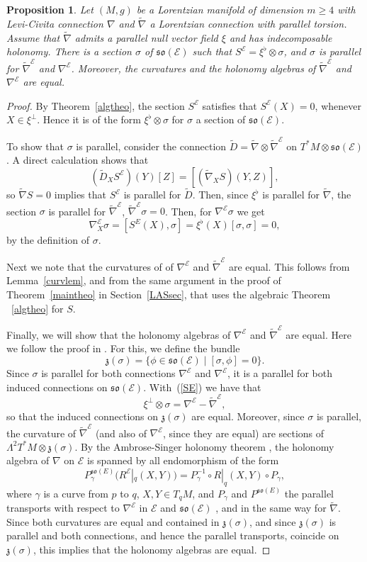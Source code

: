 \documentclass[11pt,a4paper]{amsart}
\def\blu{\color[rgb]{0,0,1}}
\newcommand{\tnab}{\widetilde{\nabla}}
\newcommand{\z}{\mathfrak{z}}
\newcommand{\+}{\oplus}
\newcommand{\so}{\mathfrak{so}}
\newcommand{\1}{\mathbf{1}}
\newcommand{\Tcom}[1]{\marginpar{\scriptsize \blu\tt #1}}
\newcommand{\E}{\mathcal{E}}
\newcommand{\tnabE}{\tnab^{\mathcal{E}}}
\newcommand{\nabE}{\nabla^{\mathcal{E}}}
\newcommand{\<}{\langle}
\renewcommand{\>}{\rangle}
\theoremstyle{definition}
\theoremstyle{plain}
\newtheorem{proposition}[definition]{Proposition}
\numberwithin{equation}{section}
\begin{document}
\begin{proposition}\label{screenprop}Let $(M,g)$ be a Lorentzian manifold of dimension $m\ge 4$ with Levi-Civita connection $\nabla$ and $\tnab$ a Lorentzian connection with parallel torsion. Assume that $
\tnab$ admits a parallel null vector field $\xi$ and has  indecomposable holonomy.
There is a section $\sigma$ of $\so(\E)$ such that $S^{\E}=\xi^\flat\otimes \sigma$, and  $\sigma $ is parallel for $ \tnab^{\E}$ and $\nabla^{\E}$. Moreover, the curvatures and the holonomy algebras of $\tnab^\E$ and $\nabla^\E$ are equal.
\end{proposition}
\begin{proof}
By Theorem~\ref{algtheo}, the section $S^\E$ satisfies that  $S^{\E}(X)=0$, whenever $X\in \xi^\perp$.  Hence it is of the form $\xi^\flat\otimes \sigma$ for $\sigma $ a section of $\so(\E)$. 

To show that $\sigma$ is parallel, consider the connection 
$\widetilde{D}=\tnab\otimes \tnab^{\E}$ on $T^*M\otimes \so(\E)$.
A direct calculation shows that 
\[(\widetilde{D}_XS^\E)(Y)[Z] =\left[ (\tnab_XS)(Y,Z)\right],\]
so $\tnab S=0$ implies that $S^\E$ is parallel for $\widetilde{D}$. Then, since $\xi^\flat$ is parallel for $\tnab$, the section $\sigma$ is parallel for $\tnab^\E$, $\tnabE\sigma=0$.
Then, for $\nabE \sigma$ we get
\[
\nabE_X\sigma = [S^E(X),\sigma ] =\xi^\flat (X)[\sigma,\sigma]=0,\]
by the definition of $\sigma$.

Next we note that the curvatures of of $\nabE$ and $\tnabE$ are equal. This follows 
from  Lemma~\ref{curvlem}, and from the same argument in the proof of Theorem~\ref{maintheo} in Section~\ref{LASsec}, that uses the algebraic Theorem ~\ref{algtheo} for $S$.


Finally, we will show that the holonomy algebras of $\nabE$ and $\tnabE$ are equal. Here we follow the proof in \cite[Proposition 2]{ErnstGalaev22}. For this, we define the bundle
\[\z(\sigma)=\{ \phi\in \so(\E)\mid [\sigma,\phi]=0\}. \]
Since $\sigma$ is parallel for both connections $\nabE$ and $\nabE$, it is a parallel for both induced connections on $\so(\E)$. With~(\ref{SE}) we have that  \[\xi^\perp\otimes \sigma=\nabE-\tnabE,\] so that the induced connections on $\z(\sigma)$ are equal. Moreover, since $\sigma$ is parallel, the curvature of $\tnabE$ (and also of $\nabE$, since they are equal) are sections of $\Lambda^2T^*M\otimes \z(\sigma)$. 
By the Ambrose-Singer holonomy theorem \cite{as}, the holonomy algebra of $\nabla$ on $\E$ is spanned by all endomorphism of the form
\[ P^{\so(E)}_\gamma(R^\E|_q (X,Y))= P_{\gamma}^{-1}\circ R|_q(X,Y) \circ  P_\gamma,\] where $\gamma $ is a curve from $p$ to $q$,  $X,Y\in T_qM$, and $P_\gamma$ and $P^{\so(E)}$ the parallel transports with respect to $\nabE$ in $\E$ and $\so(\E)$ , and in the same way for $\tnab$.
Since both curvatures are equal and contained in $\z(\sigma)$, and since $\z(\sigma)$ is parallel and both connections, and hence the parallel transports,  coincide on $\z(\sigma)$, this implies that the holonomy algebras are equal.
\end{proof}
\end{document}
